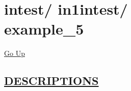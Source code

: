 \chapter*{\color{headfile}
{\large intest\slash\hspace{0pt}}
{\large in1intest\slash\hspace{0pt}}
 \\
example_5
}
\hypertarget{ecldoc:toc:intest.in1intest.example_5}{}
\hyperlink{ecldoc:toc:root/intest/in1intest}{Go Up}


\section*{\underline{\textsf{DESCRIPTIONS}}}
